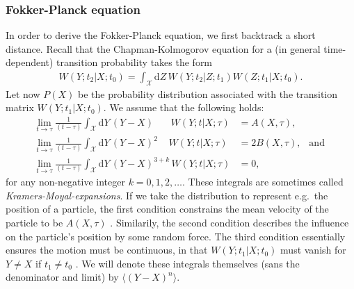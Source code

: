 \documentclass[../../master.tex]{subfiles}
\begin{document}
\subsubsection{Fokker-Planck equation}
In order to derive the Fokker-Planck equation, we first backtrack a short distance. Recall that the Chapman-Kolmogorov equation for a (in general time-dependent) transition probability takes the form 
\begin{align}
W(Y;t_2|X;t_0) = \int_\mathcal{X}\mathrm{d}Z\, W(Y;t_2|Z;t_1)W(Z;t_1|X;t_0). 
\end{align} 
Let now $P(X)$ be the probability distribution associated with the transition matrix $W(Y;t_1|X;t_0)$. We assume that the following holds:
\begin{align}
\lim_{t\rightarrow \tau}  \frac{1}{(t-\tau)} \int_\mathcal{X}\mathrm{d}Y\,(Y-X)\phantom{{}^{a+b}}\,W(Y;t|X;\tau)&=A(X,\tau), \\
%
\lim_{t\rightarrow \tau} \frac{1}{(t-\tau)} \int_\mathcal{X}\mathrm{d}Y\,(Y-X)^2\phantom{{}^{+k}}\,W(Y;t|X;\tau)&=2B(X,\tau), \ \ \text{ and }\\
%
\lim_{t\rightarrow \tau} \frac{1}{(t-\tau)} \int_\mathcal{X}\mathrm{d}Y\,(Y-X)^{3+k}\,W(Y;t|X;\tau)&=0,
\end{align}
for any non-negative integer $k=0,1,2,\dots$. These integrals are sometimes called \emph{Kramers-Moyal-expansions}. If we take the distribution to represent e.g.\ the position of a particle, the first condition constrains the mean velocity of the particle to be $A(X,\tau)$ \cite{gilks}. Similarily, the second condition describes the influence on the particle's position by some random force. The third condition essentially ensures the motion must be continuous, in that $W(Y;t_1|X;t_0)$ must vanish for $Y\not=X$ if $t_1\not=t_0$ \cite{gardiner}. We will denote these integrals themselves (sans the denominator and limit) by $\langle (Y-X)^n\rangle$.
\end{document}
